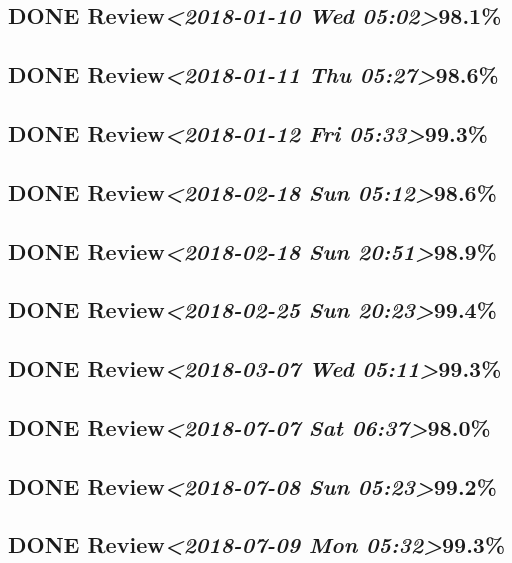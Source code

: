 \documentclass[11pt]{ctexart}
\begin{document}
\subsection{{\bfseries\sffamily DONE} Review\textit{<2018-01-10 Wed 05:02>}98.1\%}
\label{sec:org5b1df4a}
\subsection{{\bfseries\sffamily DONE} Review\textit{<2018-01-11 Thu 05:27>}98.6\%}
\label{sec:orgd685228}
\subsection{{\bfseries\sffamily DONE} Review\textit{<2018-01-12 Fri 05:33>}99.3\%}
\label{sec:org7b25388}
\subsection{{\bfseries\sffamily DONE} Review\textit{<2018-02-18 Sun 05:12>}98.6\%}
\label{sec:org9bb3bb2}
\subsection{{\bfseries\sffamily DONE} Review\textit{<2018-02-18 Sun 20:51>}98.9\%}
\label{sec:org28d53bc}
\subsection{{\bfseries\sffamily DONE} Review\textit{<2018-02-25 Sun 20:23>}99.4\%}
\label{sec:orgc35d028}

\subsection{{\bfseries\sffamily DONE} Review\textit{<2018-03-07 Wed 05:11>}99.3\%}
\label{sec:orgec954d9}
\subsection{{\bfseries\sffamily DONE} Review\textit{<2018-07-07 Sat 06:37>}98.0\%}
\label{sec:orgd7409d4}
\subsection{{\bfseries\sffamily DONE} Review\textit{<2018-07-08 Sun 05:23>}99.2\%}
\label{sec:org741588f}
\subsection{{\bfseries\sffamily DONE} Review\textit{<2018-07-09 Mon 05:32>}99.3\%}
\label{sec:org9149a84}
\end{document}
